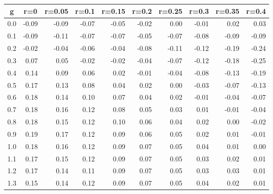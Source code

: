 %
\begin{table}[!tbp]
 \begin{center}
 \begin{tabular}{rrrrrrrrrr}\hline\hline
\multicolumn{1}{c}{g}&\multicolumn{1}{c}{r=0}&\multicolumn{1}{c}{r=0.05}&\multicolumn{1}{c}{r=0.1}&\multicolumn{1}{c}{r=0.15}&\multicolumn{1}{c}{r=0.2}&\multicolumn{1}{c}{r=0.25}&\multicolumn{1}{c}{r=0.3}&\multicolumn{1}{c}{r=0.35}&\multicolumn{1}{c}{r=0.4}\tabularnewline
\hline
0.0&-0.09&-0.09&-0.07&-0.05&-0.02& 0.00&-0.01& 0.02& 0.03\tabularnewline
0.1&-0.09&-0.11&-0.07&-0.07&-0.05&-0.07&-0.08&-0.09&-0.09\tabularnewline
0.2&-0.02&-0.04&-0.06&-0.04&-0.08&-0.11&-0.12&-0.19&-0.24\tabularnewline
0.3& 0.07& 0.05&-0.02&-0.02&-0.04&-0.07&-0.12&-0.18&-0.25\tabularnewline
0.4& 0.14& 0.09& 0.06& 0.02&-0.01&-0.04&-0.08&-0.13&-0.19\tabularnewline
0.5& 0.17& 0.13& 0.08& 0.04& 0.02& 0.00&-0.03&-0.07&-0.13\tabularnewline
0.6& 0.18& 0.14& 0.10& 0.07& 0.04& 0.02&-0.01&-0.04&-0.07\tabularnewline
0.7& 0.18& 0.16& 0.12& 0.08& 0.05& 0.03& 0.01&-0.01&-0.04\tabularnewline
0.8& 0.18& 0.15& 0.12& 0.10& 0.06& 0.04& 0.02& 0.00&-0.02\tabularnewline
0.9& 0.19& 0.17& 0.12& 0.09& 0.06& 0.05& 0.02& 0.01&-0.01\tabularnewline
1.0& 0.18& 0.16& 0.12& 0.09& 0.07& 0.05& 0.04& 0.01& 0.00\tabularnewline
1.1& 0.17& 0.15& 0.12& 0.09& 0.07& 0.05& 0.03& 0.02& 0.01\tabularnewline
1.2& 0.17& 0.14& 0.11& 0.09& 0.07& 0.05& 0.03& 0.03& 0.01\tabularnewline
1.3& 0.15& 0.14& 0.12& 0.09& 0.07& 0.05& 0.04& 0.02& 0.01\tabularnewline
\hline
\end{tabular}

\end{center}

\end{table}

